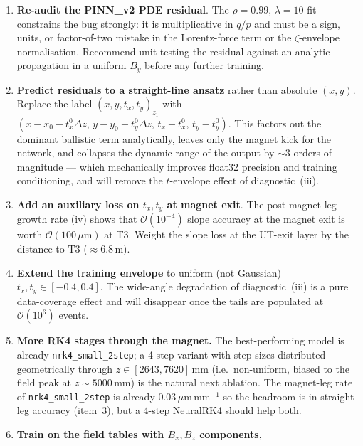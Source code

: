 \documentclass[a4paper,11pt]{article}
\begin{document}
\begin{enumerate}
  \item \textbf{Re-audit the PINN\_v2 PDE residual}. The
        $\rho=0.99$, $\lambda=10$ fit constrains the bug strongly:
        it is multiplicative in $q/p$ and must be a sign, units, or
        factor-of-two mistake in the Lorentz-force term or the
        $\zeta$-envelope normalisation. Recommend unit-testing
        the residual against an analytic propagation in a uniform
        $B_y$ before any further training.
  \item \textbf{Predict residuals to a straight-line ansatz} rather
        than absolute $(x,y)$. Replace the label
        $(x,y,t_x,t_y)_{z_1}$ with
        $(x - x_0 - t_x^0\Delta z,\,y - y_0 - t_y^0\Delta z,\,
         t_x-t_x^0,\,t_y-t_y^0)$. This factors out the dominant
        ballistic term analytically, leaves only the magnet kick
        for the network, and collapses the dynamic range of the
        output by $\sim\!3$ orders of magnitude --- which
        mechanically improves float32 precision and training
        conditioning, and will remove the $t$-envelope effect of
        diagnostic~(iii).
  \item \textbf{Add an auxiliary loss on $t_x,t_y$ at magnet exit}.
        The post-magnet leg growth rate (iv) shows that
        $\mathcal O(10^{-4})$ slope accuracy at the magnet exit is
        worth $\mathcal O(100\,\mu\mathrm{m})$ at T3. Weight the
        slope loss at the UT-exit layer by the distance to T3
        ($\approx 6.8\,$m).
  \item \textbf{Extend the training envelope} to uniform (not
        Gaussian) $t_x,t_y\in[-0.4,0.4]$. The wide-angle
        degradation of diagnostic~(iii) is a pure data-coverage
        effect and will disappear once the tails are populated
        at $\mathcal O(10^6)$ events.
  \item \textbf{More RK4 stages through the magnet.} The
        best-performing model is already \texttt{nrk4\_small\_2step};
        a 4-step variant with step sizes distributed
        geometrically through $z\in[2643,7620]$\,mm (i.e.\
        non-uniform, biased to the field peak at $z\sim 5000$\,mm)
        is the natural next ablation. The magnet-leg rate of
        \texttt{nrk4\_small\_2step} is already
        $0.03\,\mu\mathrm{m}\,\mathrm{mm}^{-1}$ so the headroom is
        in straight-leg accuracy (item~3), but a 4-step NeuralRK4
        should help both.
  \item \textbf{Train on the field tables with $B_x,B_z$ components},

\end{enumerate}
\end{document}

